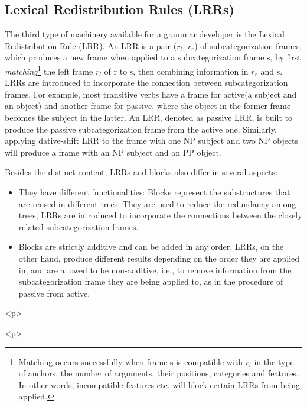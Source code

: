  
\subsection{Lexical Redistribution Rules (LRRs)} 
The third type of machinery available for a grammar developer is the 
Lexical Redistribution Rule (LRR). An LRR is a pair 
($r_{l}$, $r_{r}$) of subcategorization frames, 
which produces a new frame when applied to a subcategorization frame s, 
by first {\it matching}\footnote{Matching occurs successfully when frame s is compatible with $r_{l}$ in the type of anchors, the number of arguments, their positions, categories and features. In other words, incompatible features etc. will block certain LRRs from being applied.} 
 the 
left frame $r_{l}$ of r to s, then 
combining information in $r_{r}$ and s. 
LRRs are introduced to incorporate 
the connection between subcategorization frames. For example, 
most transitive verbs have a frame for active(a subject and an object) 
and another frame for passive, where the object in the former frame becomes 
the subject in the latter. An LRR, denoted as  passive LRR, 
is built to produce the passive subcategorization frame from 
the active one. 
Similarly, applying dative-shift LRR to the frame with 
one NP subject and two NP objects will produce 
a frame with an NP subject and an PP object. 
 
 
Besides the distinct content, LRRs and blocks also differ in several 
aspects: 
\begin{itemize} 
  \item They have different functionalities: Blocks represent 
    the substructures that are reused in different trees. They 
    are used to reduce the redundancy among trees; LRRs are introduced 
    to incorporate the connections between the closely 
     related subcategorization 
    frames. 
  \item Blocks are strictly additive and can be added in any order. 
       LRRs, on the other hand, 
    produce different results depending on the order they are applied in, 
    and 
    are allowed to be non-additive, i.e., to remove information from 
    the subcategorization frame they are being applied to, as in 
    the procedure of passive from active. 
\end{itemize} 
    
 
 
\begin{rawhtml} <p> \end{rawhtml}
\centerline{} 
\begin{rawhtml} <dl> <dt>{Elementary trees generated from combining blocks <p> </dl> \end{rawhtml}
\label{elem} 
\begin{rawhtml} <p> \end{rawhtml}
 
